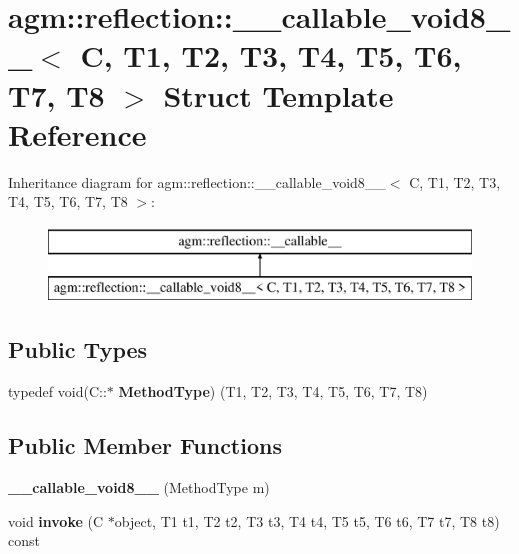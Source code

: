 \hypertarget{structagm_1_1reflection_1_1____callable__void8____}{}\section{agm\+:\+:reflection\+:\+:\+\_\+\+\_\+callable\+\_\+void8\+\_\+\+\_\+$<$ C, T1, T2, T3, T4, T5, T6, T7, T8 $>$ Struct Template Reference}
\label{structagm_1_1reflection_1_1____callable__void8____}
Inheritance diagram for agm\+:\+:reflection\+:\+:\+\_\+\+\_\+callable\+\_\+void8\+\_\+\+\_\+$<$ C, T1, T2, T3, T4, T5, T6, T7, T8 $>$\+:\begin{figure}[H]
\begin{center}
\leavevmode
\includegraphics[height=2.000000cm]{structagm_1_1reflection_1_1____callable__void8____}
\end{center}
\end{figure}
\subsection*{Public Types}
\begin{DoxyCompactItemize}
\item 
typedef void(C\+::$\ast$ {\bfseries Method\+Type}) (T1, T2, T3, T4, T5, T6, T7, T8)\hypertarget{structagm_1_1reflection_1_1____callable__void8_____a0cab163624b40083013d8b0a4b870c6b}{}\label{structagm_1_1reflection_1_1____callable__void8_____a0cab163624b40083013d8b0a4b870c6b}

\end{DoxyCompactItemize}
\subsection*{Public Member Functions}
\begin{DoxyCompactItemize}
\item 
{\bfseries \+\_\+\+\_\+callable\+\_\+void8\+\_\+\+\_\+} (Method\+Type m)\hypertarget{structagm_1_1reflection_1_1____callable__void8_____ab383cf7238d047ff9873600b0a5ab320}{}\label{structagm_1_1reflection_1_1____callable__void8_____ab383cf7238d047ff9873600b0a5ab320}

\item 
void {\bfseries invoke} (C $\ast$object, T1 t1, T2 t2, T3 t3, T4 t4, T5 t5, T6 t6, T7 t7, T8 t8) const \hypertarget{structagm_1_1reflection_1_1____callable__void8_____aee6bf95cecacc0ec68e56dd4c76c0a4f}{}\label{structagm_1_1reflection_1_1____callable__void8_____aee6bf95cecacc0ec68e56dd4c76c0a4f}

\end{DoxyCompactItemize}
